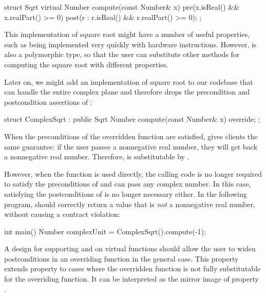 \begin{codeblock}
struct Sqrt {
  virtual Number compute(const Number& x)
    pre(x.isReal() && x.realPart() >= 0)
    post(r : r.isReal() && r.realPart() >= 0);
};
\end{codeblock}
This implementation of square root might have a number of useful properties, such as being
implemented very quickly with hardware instructions. However,  is also a polymorphic type, so that the user can substitute other methods for computing the square root with different properties.

Later on, we might add an implementation of square root to our codebase that can handle the entire complex plane and therefore drops the precondition and postcondition assertions of :

\begin{codeblock}
struct ComplexSqrt : public Sqrt {
  Number compute(const Number& x) override;
};
\end{codeblock}
When the preconditions of the overridden function  are satisfied, \allowbreak{} gives clients the same guarantee: if the user passes a nonnegative real number, they will get back a nonnegative real number. Therefore,  is substitutable by . 

However, when the function  is used directly, the calling code is no longer required to satisfy the preconditions of  and can pass any complex number. In this case, satisfying the postconditions of  is no longer necessary either. In the following program,  should correctly return a value that is \emph{not} a nonnegative real number, without causing a contract violation:

\begin{codeblock}
int main() {
  Number complexUnit = ComplexSqrt().compute(-1);
}
\end{codeblock}


A design for supporting  and  on virtual functions should allow the user to widen postconditions in an overriding function in the general case. This property extends property  to cases where the overridden function is not fully substitutable for the overriding function. It can be interpreted as the mirror image of property .


